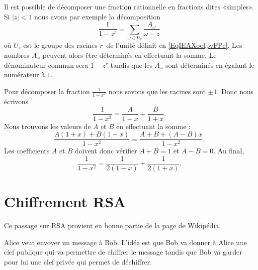 Il est possible de décomposer une fraction rationnelle en fractions dites «simples». Si \( | z |<1\) nous avons par exemple la décomposition
\begin{equation}        \label{EqDWYBooJIMBAt}
    \frac{1}{ 1-z^r }=\sum_{\omega\in U_r}\frac{ A_{\omega} }{ \omega-z }
\end{equation}
où \( U_r\) est le groupe des racines \( r\)\ieme\ de l'unité définit en \eqref{EqIEAXooIpvFPe}. Les nombres \( A_{\omega}\) peuvent alors être déterminés en effectuant la somme. Le dénominateur commun sera \( 1-z^r\) tandis que les \( A_{\omega}\) sont déterminés en égalant le numérateur à \( 1\).

\begin{example}
    Pour décomposer la fraction \( \frac{1}{ 1-x^2 }\) nous savons que les racines sont \( \pm 1\). Donc nous écrivons
    \begin{equation}
        \frac{1}{ 1-x^2 }=\frac{ A }{ 1-x }+\frac{ B }{ 1+x }.
    \end{equation}
    Nous trouvons les valeurs de \( A\) et \( B\) en effectuant la somme :
    \begin{equation}
        \frac{ A(1+x)+B(1-x) }{ 1-x^2 }=\frac{ A+B+(A-B)x }{ 1-x^2 }.
    \end{equation}
    Les coefficients \( A\) et \( B\) doivent donc vérifier \( A+B=1\) et \( A-B=0\). Au final,
    \begin{equation}
        \frac{1}{ 1-x^2 }=\frac{1}{ 2(1-x) }+\frac{1}{ 2(1+x) }.
    \end{equation}
\end{example}

\section{Chiffrement RSA}
\label{SecEVaFYi}

Ce passage sur RSA provient en bonne partie de la page de Wikipédia\cite{ooRIFDooNxOehF}.

Alice veut envoyer un message à Bob. L'idée est que Bob va donner à Alice une clef publique qui va permettre de chiffrer le message tandis que Bob va garder pour lui une clef privée qui permet de déchiffrer.

